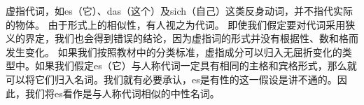 虚指代词，如es（它）、das（这个）及sich（自己）这类反身动词，并不指代实际的物体。
由于形式上的相似性，有人视之为代词。
即使我们假定要对代词采用狭义的界定，我们也会得到错误的结论，因为虚指词的形式并没有根据性、数和格而发生变化。
如果我们按照教材中的分类标准，虚指成分可以归入无屈折变化的类型中。如果我们假定es（它）与人称代词一定具有相同的主格和宾格形式，那么就可以将它们归入名词。我们就有必要承认，es是有性的这一假设是讲不通的。因此，我们将es看作是与人称代词相似的中性名词。

